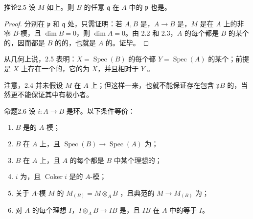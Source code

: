 \begin{SGAresult}{推论}{2.5}
设 $M$ 如上。则 $B$ 的任意 $\mathfrak q$ 在 $A$ 中的 $\mathfrak p$ 也是。
\end{SGAresult}
\begin{proof}
分别在 $\mathfrak p$ 和 $\mathfrak q$ 处，只需证明：若 $A,B$ 是，$A\to B$ 是，$M$ 是在 $A$ 上的非零 $B$-模，且 $\dim B=0$，则 $\dim A=0$。由 2.2 和 2.3，$A$ 的每个都是 $B$ 的某个的，因而都是 $B$ 的的，也就是 $A$ 的。证毕。
\end{proof}
从几何上说，2.5 表明：$X=\operatorname{Spec}(B)$ 的每个都 $Y=\operatorname{Spec}(A)$ 的某个；前提是 $X$ 上存在一个的，它的为 $X$，并且相对于 $Y$ 。

注意，2.4 并未假设 $M$ 在 $A$ 上；但这样一来，也就不能保证存在包含 $\mathfrak pB$ 的，当然更不能保证其中有极小者。

\begin{SGAresult}{命题}{2.6}
设 $i:A\to B$ 是环。以下条件等价：
\begin{enumerate}
\item[(i)] $B$ 是的 $A$-模；
\item[(ii)] $B$ 在 $A$ 上，且 $\operatorname{Spec}(B)\to\operatorname{Spec}(A)$ 为；
\item[(ii bis)] $B$ 在 $A$ 上，且 $A$ 的每个都是 $B$ 中某个理想的；
\item[(iii)] $i$ 为，且 $\operatorname{Coker}i$ 是的 $A$-模；
\item[(iv)] 关于 $A$-模 $M$ 的 $M_{(B)}=M\otimes_A B$ ，且典范的 $M\to M_{(B)}$ 为；
\item[(iv bis)] 对 $A$ 的每个理想 $I$，$I\otimes_A B\to IB$ 是，且 $IB$ 在 $A$ 中的等于 $I$。
\end{enumerate}
\end{SGAresult}

